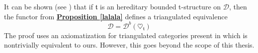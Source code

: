 \begin{rem}\label{equiv}
It can be shown (see \cite{hub}) that if $\mathfrak{t}$ is an hereditary bounded t-structure on $\mathscr{D}$, then the functor from \hyperref[lalala]{\textbf{Proposition \ref*{lalala}}} defines a triangulated equivalence $$\mathscr{D}=\mathscr{D}^b(\heartsuit_{\mathfrak{t}})$$ 
The proof uses an axiomatization for triangulated categories present in \cite{nee} which is nontrivially equivalent to ours. However, this goes beyond the scope of this thesis. 
\end{rem}
%
%
%
%
%

